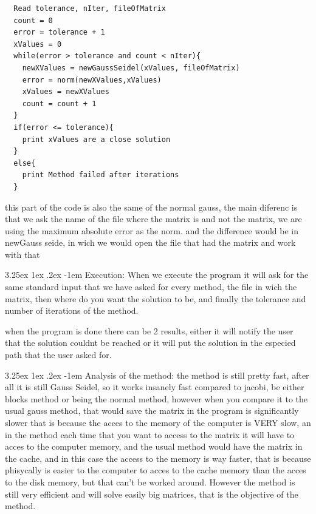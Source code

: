 \documentclass{article}
\makeatletter
\renewcommand\paragraph{\@startsection{paragraph}{5}{\z@}%
  {3.25ex \@plus1ex \@minus.2ex}%
  {-1em}%
  {\normalfont\normalsize\bfseries}}
\makeatother
\begin{document}
\begin{lstlisting}
  Read tolerance, nIter, fileOfMatrix
  count = 0
  error = tolerance + 1
  xValues = 0 
  while(error > tolerance and count < nIter){
    newXValues = newGaussSeidel(xValues, fileOfMatrix)
    error = norm(newXValues,xValues)
    xValues = newXValues
    count = count + 1
  }
  if(error <= tolerance){
    print xValues are a close solution
  }
  else{
    print Method failed after iterations
  }
\end{lstlisting}

this part of the code is also the same of the normal gauss, the main diferenc is that we ask the name of the file where the matrix is
and not the matrix, we are using the maximum absolute error as the norm. and the difference would be in newGauss seide, in wich we would
open the file that had the matrix and work with that


\paragraph{Execution:}
\hfill \break
When we execute the program it will ask for the same standard input that we have asked for every method, the file in wich the matrix,
then where do you want the solution to be, and finally the tolerance and number of iterations of the method.

when the program is done there can be 2 results, either it will notify the user that the solution couldnt be reached or it will put the solution
in the especied path that the user asked for.

\paragraph{Analysis of the method:}
\hfill \break
the method is still pretty fast, after all it is still Gauss Seidel, so it works insanely fast compared to jacobi, be either blocks method or 
being the normal method, however when you compare it to the usual gauss method, that would save the matrix in the program is significantly slower
that is because the acces to the memory of the computer is VERY slow, an in the method each time that you want to access to the matrix it will have
to acces to the computer memory, and the usual method would have the matrix in the cache, and in this case the access to the memory is way faster,
that is because phisycally is easier to the computer to acces to the cache memory than the acces to the disk memory, but that can't be worked around.
However the method is still very efficient and will solve easily big matrices, that is the objective of the method.
\end{document}
